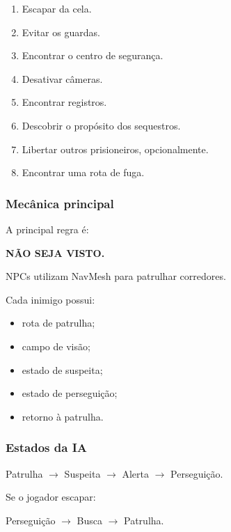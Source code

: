 \documentclass[12pt,a4paper]{article}
\begin{document}
\begin{enumerate}
    \item Escapar da cela.
    \item Evitar os guardas.
    \item Encontrar o centro de segurança.
    \item Desativar câmeras.
    \item Encontrar registros.
    \item Descobrir o propósito dos sequestros.
    \item Libertar outros prisioneiros, opcionalmente.
    \item Encontrar uma rota de fuga.
\end{enumerate}

\subsubsection*{Mecânica principal}

A principal regra é:

\begin{center}
\textbf{NÃO SEJA VISTO.}
\end{center}

NPCs utilizam NavMesh para patrulhar corredores.

Cada inimigo possui:

\begin{itemize}
    \item rota de patrulha;
    \item campo de visão;
    \item estado de suspeita;
    \item estado de perseguição;
    \item retorno à patrulha.
\end{itemize}

\subsubsection*{Estados da IA}

\begin{center}
Patrulha
$\rightarrow$
Suspeita
$\rightarrow$
Alerta
$\rightarrow$
Perseguição.
\end{center}

Se o jogador escapar:

\begin{center}
Perseguição
$\rightarrow$
Busca
$\rightarrow$
Patrulha.
\end{center}
\end{document}
